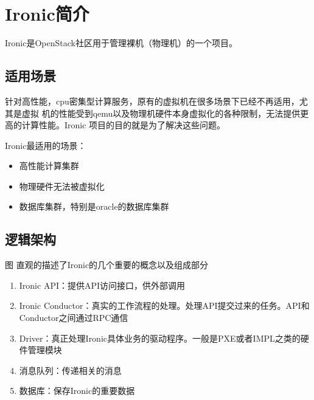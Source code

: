 \chapter{Ironic简介}
Ironic是OpenStack社区用于管理裸机（物理机）的一个项目。

\section{适用场景}

针对高性能，cpu密集型计算服务，原有的虚拟机在很多场景下已经不再适用，尤其是虚拟
机的性能受到qemu以及物理机硬件本身虚拟化的各种限制，无法提供更高的计算性能。Ironic
项目的目的就是为了解决这些问题。
\par Ironic最适用的场景：
\begin{itemize}
  \item 高性能计算集群
  \item 物理硬件无法被虚拟化
  \item 数据库集群，特别是oracle的数据库集群
\end{itemize}

\section{逻辑架构}

图 
直观的描述了Ironic的几个重要的概念以及组成部分

\begin{enumerate}
  \item Ironic API：提供API访问接口，供外部调用
  \item Ironic Conductor：真实的工作流程的处理。处理API提交过来的任务。API和Conductor之间通过RPC通信
  \item Driver：真正处理Ironic具体业务的驱动程序。一般是PXE或者IMPL之类的硬件管理模块
  \item 消息队列：传递相关的消息
  \item 数据库：保存Ironic的重要数据
\end{enumerate}

